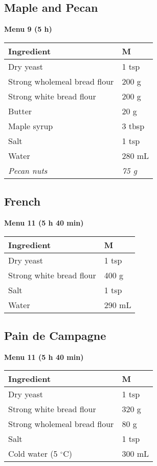 \documentclass[a4paper,10pt,twocolumn,landscape]{article}
\newcommand{\sectionspacing}{0.1cm}
\begin{document}
\subsection*{Maple and Pecan}
\vspace{\sectionspacing}
\textbf{Menu 9 (5 h)}\\
\begin{tabular}{L{4.5cm}L{2cm}}
\toprule
\textbf{Ingredient} & \textbf{M} \\
\midrule
Dry yeast & 1 tsp \\
Strong wholemeal bread flour & 200 g \\
Strong white bread flour & 200 g \\
Butter & 20 g \\
Maple syrup & 3 tbsp \\
Salt & 1 tsp \\
Water & 280 mL \\
\textit{Pecan nuts}& \textit{75 g} \\
\bottomrule
\end{tabular}

\subsection*{French}
\vspace{\sectionspacing}
\textbf{Menu 11 (5 h 40 min)}\\
\begin{tabular}{L{4.5cm}L{2cm}}
\toprule
\textbf{Ingredient} & \textbf{M} \\
\midrule
Dry yeast & 1 tsp \\
Strong white bread flour & 400 g \\
Salt & 1 tsp \\
Water & 290 mL \\
\bottomrule
\end{tabular}

\subsection*{Pain de Campagne}
\vspace{\sectionspacing}
\textbf{Menu 11 (5 h 40 min)}\\
\begin{tabular}{L{4.5cm}L{2cm}}
\toprule
\textbf{Ingredient} & \textbf{M} \\
\midrule
Dry yeast & 1 tsp \\
Strong white bread flour & 320 g \\
Strong wholemeal bread flour & 80 g \\
Salt & 1 tsp \\
Cold water (5 $^{\circ}$C) & 300 mL \\
\bottomrule
\end{tabular}
\end{document}
